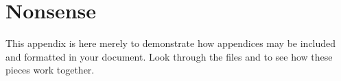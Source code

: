 \chapter{Nonsense}

This appendix is here merely to demonstrate how appendices may be
included and formatted in your document.  Look through the files
 and  to see how these pieces work
together.

